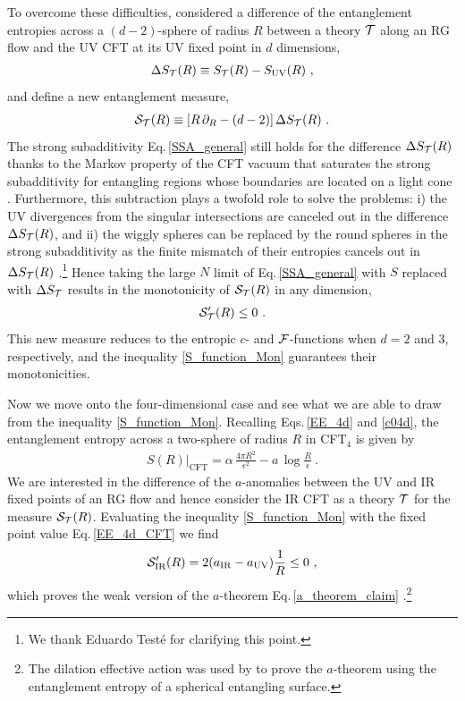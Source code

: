 To overcome these difficulties, \textcite{Casini:2017vbe,Lashkari:2017rcl} considered a difference of the entanglement entropies across a $(d-2)$-sphere of radius $R$ between a theory ${\cal T}$ along an RG flow and the UV CFT at its UV fixed point in $d$ dimensions,
\begin{align}
	\Delta S_{\cal T} (R) \equiv S_{\cal T}(R) - S_\text{UV}(R) \ ,
\end{align}
and define a new entanglement measure,
\begin{align}\label{S_function}
	{\cal S}_{\cal T} (R) \equiv \left[ R\,\partial_R -(d-2)\right] \Delta S_{\cal T} (R) \ .
\end{align}
The strong subadditivity Eq.\,\eqref{SSA_general} still holds for the difference $\Delta S_{\cal T} (R)$ thanks to the Markov property of the CFT vacuum that saturates the strong subadditivity for entangling regions whose boundaries are located on a light cone \cite{Casini:2017roe}.
Furthermore, this subtraction plays a twofold role to solve the problems: i)
the UV divergences from the singular intersections are canceled out in the difference $\Delta S_{\cal T} (R)$, and ii) the wiggly spheres can be replaced by the round spheres in the strong subadditivity as the finite mismatch of their entropies cancels out in $\Delta S_{\cal T} (R)$ \cite{Casini:2018kzx}.\footnote{We thank Eduardo Test{\'e} for clarifying this point.}
Hence taking the large $N$ limit of Eq.\,\eqref{SSA_general} with $S$ replaced with $\Delta S_{\cal T}$ results in the monotonicity of ${\cal S}_{\cal T} (R)$ in any dimension,
\begin{align}\label{S_function_Mon}
	{\cal S}'_{\cal T} (R) \le 0 \ .
\end{align}
This new measure reduces to the entropic $c$- and ${\cal F}$-functions when $d=2$ and $3$, respectively, and the inequality \eqref{S_function_Mon} guarantees their monotonicities.

Now we move onto the four-dimensional case and see what we are able to draw from the inequality \eqref{S_function_Mon}.
Recalling Eqs.\,\eqref{EE_4d} and \eqref{c04d}, the entanglement entropy across a two-sphere of radius $R$ in CFT$_4$ is given by
\begin{align}\label{EE_4d_CFT}
	S(R)|_\text{CFT} = \alpha\,\frac{4\pi R^2}{\epsilon^2} - a\, \log \frac{R}{\epsilon} \ .
\end{align}
We are interested in the difference of the $a$-anomalies between the UV and IR fixed points of an RG flow and hence consider the IR CFT as a theory ${\cal T}$ for the measure ${\cal S}_{\cal T} (R)$.
Evaluating the inequality \eqref{S_function_Mon} with the fixed point value Eq.\,\eqref{EE_4d_CFT} we find
\begin{align}
	{\cal S}_\text{IR}'(R) = 2 (a_\text{IR} - a_\text{UV}) \frac{1}{R} \le 0 \ ,
\end{align}
which proves the weak version of the $a$-theorem Eq.\,\eqref{a_theorem_claim}  \cite{Casini:2017vbe}.\footnote{The dilation effective action was used by \textcite{Solodukhin:2013yha} to prove the $a$-theorem using the entanglement entropy of a spherical entangling surface.
}

